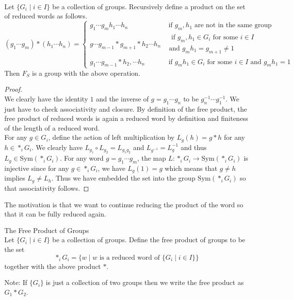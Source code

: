 \documentclass[a4paper]{article}
\begin{document}
\begin{prp}{}{}\\
Let $\{G_i\;|\;i\in I\}$ be a collection of groups. Recursively define a product on the set of reduced words as follows. $$(g_1\cdots g_m)\ast(h_1\cdots h_n)=\begin{cases}
g_1\cdots g_mh_1\cdots h_n& \text{ if $g_m,h_1$ are not in the same group }\\
g\cdots g_{m-1}\ast g_{m+1}\ast h_2\cdots h_n & \substack{\text{ if }g_m,h_1\in G_i \text{ for some }i\in I\\\text{and }g_mh_1=g_{m+1}\neq 1}\\
g_1\cdots g_{m-1}\ast h_2,\cdots h_n & \text{ if $g_mh_1\in G_i$ for some $i\in I$ and $g_mh_1=1$}
\end{cases}$$
Then $F_S$ is a group with the above operation. 
\begin{proof}\\
We clearly have the identity $1$ and the inverse of $g=g_1\cdots g_n$ to be $g_n^{-1}\cdots g_1^{-1}$. We just have to check associativity and closure. By definition of the free product, the free product of reduced words is again a reduced word by definition and finiteness of the length of a reduced word. \\
For any $g\in G_i$, define the action of left multiplication by $L_g(h)=g\ast h$ for any $h\in\ast_iG_i$. We clearly have $L_{g_1}\circ L_{g_2}=L_{g_1g_2}$ and $L_{g^{-1}}=L_g^{-1}$ and thus $L_g\in\text{Sym}(\ast_iG_i)$. For any word $g=g_1\cdots g_m$, the map $L:\ast_iG_i\to\text{Sym}(\ast_iG_i)$ is injective since for any $g\in\ast_iG_i$, we have $L_g(1)=g$ which means that $g\neq h$ implies $L_g\neq L_h$. Thus we have embedded the set into the group $\text{Sym}(\ast_iG_i)$ so that associativity follows. 
\end{proof}
\end{prp}

The motivation is that we want to continue reducing the product of the word so that it can be fully reduced again. 

\begin{defn}{The Free Product of Groups}{}\\
Let $\{G_i\;|\;i\in I\}$ be a collection of groups. Define the free product of groups to be the set $$\ast_i G_i=\{w\;|\;w\text{ is a reduced word of }\{G_i\;|\;i\in I\}\}$$ together with the above product $\ast$. 
\end{defn}

Note: If $\{G_i\}$ is just a collection of two groups then we write the free product as $G_1\ast G_2$. \\
\end{document}
